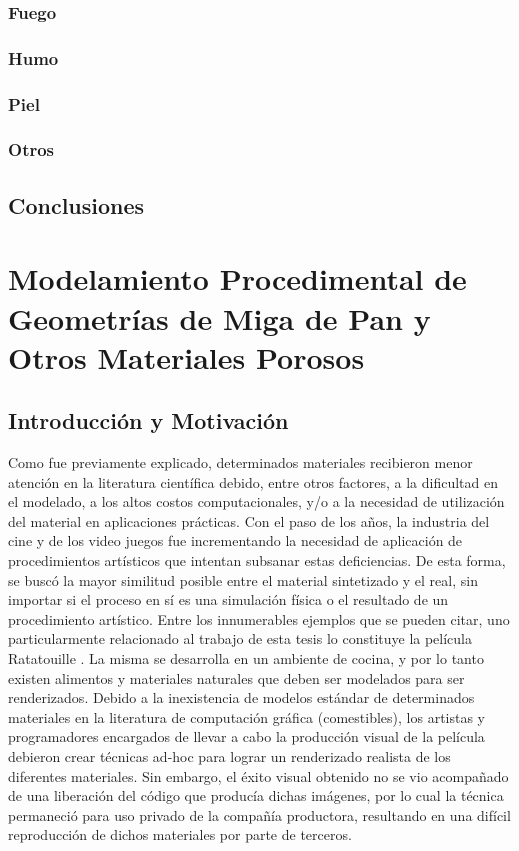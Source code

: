 \documentclass[spanish,a4paper,11pt,oneside,links]{report}
\begin{document}
\subsection{Fuego}
\subsection{Humo}
\subsection{Piel}
\subsection{Otros}


\section{Conclusiones}


\chapter{Modelamiento Procedimental de Geometrías de Miga de Pan y Otros Materiales Porosos}
\section{Introducción y Motivación} %
Como fue previamente explicado, determinados materiales recibieron menor atención en la literatura científica debido, entre otros factores, a la dificultad en el modelado, a los altos costos computacionales, y/o a la necesidad de utilización del material en aplicaciones prácticas.
Con el paso de los a\~nos, la industria del cine y de los video juegos fue incrementando la necesidad de aplicación de procedimientos artísticos que intentan subsanar estas deficiencias.
De esta forma, se busc\'o la mayor similitud posible entre el material sintetizado y el real, sin importar si el proceso en sí es una simulación física o el resultado de un procedimiento artístico.
Entre los innumerables ejemplos que se pueden citar, uno particularmente relacionado al trabajo de esta tesis lo constituye la película Ratatouille \cite{Cho2007}.
La misma se desarrolla en un ambiente de cocina, y por lo tanto existen alimentos y materiales naturales que deben ser modelados para ser renderizados.
Debido a la inexistencia de modelos estándar de determinados materiales en la literatura de computación gráfica (comestibles), los artistas y programadores encargados de llevar a cabo la producción visual de la película debieron crear técnicas ad-hoc para lograr un renderizado realista de los diferentes materiales.
Sin embargo, el éxito visual obtenido no se vio acompañado de una liberación del código que producía dichas imágenes, por lo cual la técnica permaneció para uso privado de la compañía productora, resultando en una difícil reproducción de dichos materiales por parte de terceros.
\end{document}
